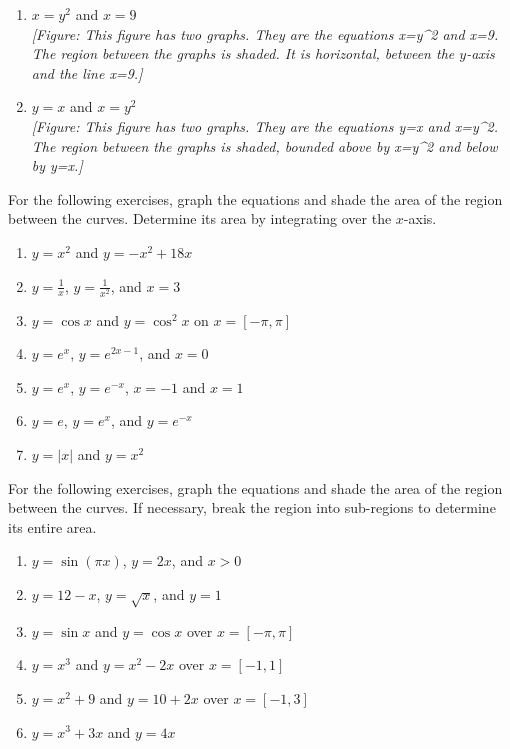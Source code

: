 \documentclass{exercises}
\begin{document}
\begin{enumerate}[resume]
\item $x=y^{2}$ and $x=9$ \\ \textit{[Figure: This figure has two graphs. They are the equations x=y\textasciicircum{}2 and x=9. The region between the graphs is shaded. It is horizontal, between the $y$-axis and the line x=9.]}
\item $y=x$ and $x=y^{2}$ \\ \textit{[Figure: This figure has two graphs. They are the equations y=x and x=y\textasciicircum{}2. The region between the graphs is shaded, bounded above by x=y\textasciicircum{}2 and below by y=x.]}
\end{enumerate}

For the following exercises, graph the equations and shade the area of the region between the curves. Determine its area by integrating over the $x$-axis.

\begin{enumerate}[resume]
\item $y=x^{2}$ and $y=-x^{2}+18x$
\item $y=\frac{1}{x}$, $y=\frac{1}{x^{2}}$, and $x=3$
\item $y=\cos x$ and $y=\cos^{2}x$ on $x=[-\pi,\pi]$
\item $y=e^{x}$, $y=e^{2x-1}$, and $x=0$
\item $y=e^{x}$, $y=e^{-x}$, $x=-1$ and $x=1$
\item $y=e$, $y=e^{x}$, and $y=e^{-x}$
\item $y=|x|$ and $y=x^{2}$
\end{enumerate}

For the following exercises, graph the equations and shade the area of the region between the curves. If necessary, break the region into sub-regions to determine its entire area.

\begin{enumerate}[resume]
\item $y=\sin(\pi x)$, $y=2x$, and $x>0$
\item $y=12-x$, $y=\sqrt{x}$, and $y=1$
\item $y=\sin x$ and $y=\cos x$ over $x=[-\pi,\pi]$
\item $y=x^{3}$ and $y=x^{2}-2x$ over $x=[-1,1]$
\item $y=x^{2}+9$ and $y=10+2x$ over $x=[-1,3]$
\item $y=x^{3}+3x$ and $y=4x$
\end{enumerate}
\end{document}
